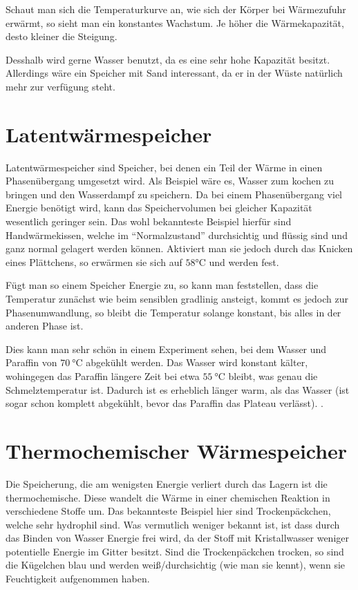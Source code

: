 \documentclass[12pt,a4paper,titlepage,headinclude,bibtotoc]{scrartcl}
\begin{document}
Schaut man sich die Temperaturkurve an, wie sich der Körper bei Wärmezufuhr erwärmt, so sieht man ein konstantes Wachstum.
Je höher die Wärmekapazität, desto kleiner die Steigung.

Desshalb wird gerne Wasser benutzt, da es eine sehr hohe Kapazität besitzt.
Allerdings wäre ein Speicher mit Sand interessant, da er in der Wüste natürlich mehr zur verfügung steht.





\section{Latentwärmespeicher}
Latentwärmespeicher sind Speicher, bei denen ein Teil der Wärme in einen Phasenübergang umgesetzt wird.
Als Beispiel wäre es, Wasser zum kochen zu bringen und den Wasserdampf zu speichern.
Da bei einem Phasenübergang viel Energie benötigt wird, kann das Speichervolumen bei gleicher Kapazität wesentlich geringer sein.
Das wohl bekannteste Beispiel hierfür sind Handwärmekissen, welche im "`Normalzustand"' durchsichtig und flüssig sind und ganz normal gelagert werden können.
Aktiviert man sie jedoch durch das Knicken eines Plättchens, so erwärmen sie sich auf $58\si\celsius$ und werden fest.

Fügt man so einem Speicher Energie zu, so kann man feststellen, dass die Temperatur zunächst wie beim sensiblen gradlinig ansteigt, kommt es jedoch zur Phasenumwandlung, so bleibt die Temperatur solange konstant, bis alles in der anderen Phase ist.

Dies kann man sehr schön in einem Experiment sehen, bei dem Wasser und Paraffin von $\SI{70}\celsius$ abgekühlt werden.
Das Wasser wird konstant kälter, wohingegen das Paraffin längere Zeit bei etwa $\SI{55}\celsius$ bleibt, was genau die Schmelztemperatur ist.
Dadurch ist es erheblich länger warm, als das Wasser (ist sogar schon komplett abgekühlt, bevor das Paraffin das Plateau verlässt).
.




\section{Thermochemischer Wärmespeicher}
Die Speicherung, die am wenigsten Energie verliert durch das Lagern ist die thermochemische.
Diese wandelt die Wärme in einer chemischen Reaktion in verschiedene Stoffe um.
Das bekannteste Beispiel hier sind Trockenpäckchen, welche sehr hydrophil sind.
Was vermutlich weniger bekannt ist, ist dass durch das Binden von Wasser Energie frei wird, da der Stoff mit Kristallwasser weniger potentielle Energie im Gitter besitzt.
Sind die Trockenpäckchen trocken, so sind die Kügelchen blau und werden weiß/durchsichtig (wie man sie kennt), wenn sie Feuchtigkeit aufgenommen haben.
\end{document}
